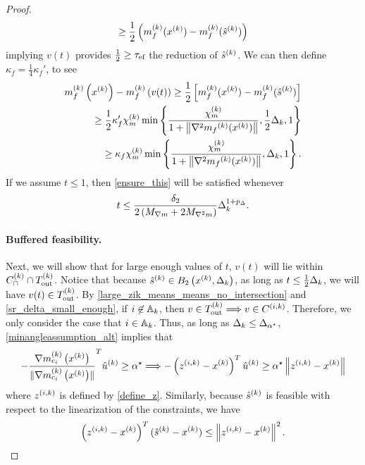 \begin{proof}
\begin{align*}
\ge \frac 1 2 \left(m_f^{(k)}(x^{(k)}) - m_f^{(k)}({{\hat s}^{(k)}} )\right)
\end{align*}
implying $v(t)$ provides $\frac 1 2 \ge {\tau_{\textrm{ef}}}$ the reduction of ${{\hat s}^{(k)}} $.
We can then define $\kappa_f = \frac 1 4 \kappa_f'$, to see
\begin{align*}
m_f^{(k)}\left(x^{(k)}\right) - m_f^{(k)}\left(v(t)\right)
\ge \frac 1 2 \left[m_f^{(k)}(x^{(k)}) - m_f^{(k)}({{\hat s}^{(k)}} )\right] \\
\ge \frac 1 2 \kappa_f' {\chi_m^{(k)}} \min\left\{ \frac{{\chi_m^{(k)}}}{1+\left\|\nabla^2 {{m}_f}^{(k)}(x^{(k)})\right\|}, \frac 1 2 \Delta_k, 1 \right\} \\
\ge \kappa_f {\chi_m^{(k)}} \min\left\{ \frac{{\chi_m^{(k)}}}{1+\left\|\nabla^2 {{m}_f}^{(k)}(x^{(k)})\right\|}, \Delta_k, 1 \right\}.
\end{align*}
If we assume $t \le 1$, then \cref{ensure_this} will be satisfied whenever
\begin{align*}
t \le \frac {\delta_2}{2\left({M_{\nabla m}} + 2{M_{\nabla^2 m}}\right)} \Delta_k^{1 + p_{\Delta}}.
\end{align*}




\paragraph*{Buffered feasibility.}
Next, we will show that for large enough values of $t$, $v(t)$ will lie within ${C^{(k)}_{\cap}} \cap {T_{\text{out}}^{(k)}}$.
Notice that because ${{\hat s}^{(k)}}  \in B_2\left(x^{(k)}, \Delta_k\right)$, as long as $t \le \frac 1 2 \Delta_k$, we will have $v(t) \in {T_{\text{out}}^{(k)}}$.
By \cref{large_zik_means_means_no_intersection} and \cref{sr_delta_small_enough}, if $i \not \in {\mathbb A_{k}}$, then $v \in {T_{\text{out}}^{(k)}} \Longrightarrow v \in {C^{(i, k)}}$.
Therefore, we only consider the case that $i \in {\mathbb A_{k}}$.
Thus, as long as $\Delta_k \le {\Delta_{\alpha^{\star}}}$, \cref{minangleassumption_alt} implies that
\begin{align}
-\frac {{\nabla m_{c_i}^{(k)}\left(x^{(k)}\right)}}{\|{\nabla m_{c_i}^{(k)}\left(x^{(k)}\right)}\|} ^T{{\hat u}^{(k)}} \ge { \alpha^{\star} } \Longrightarrow -\left({z^{(i, k)}} - x^{(k)}\right)^T{{\hat u}^{(k)}} \ge { \alpha^{\star} } \left\|{z^{(i, k)}} - x^{(k)}\right\| \label{u_is_feasible}
\end{align}
where ${z^{(i, k)}}$ is defined by \cref{define_z}.
Similarly, because ${{\hat s}^{(k)}} $ is feasible with respect to the linearization of the constraints, we have
\begin{align}
\left({z^{(i, k)}} - x^{(k)}\right)^T({{\hat s}^{(k)}}  - x^{(k)}) \le \left\|{z^{(i, k)}} - x^{(k)}\right\|^2. \label{gc_is_feasible}
\end{align}


\end{proof}

